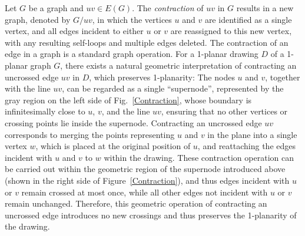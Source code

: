 \documentclass[12pt,a4paper]{article}
\begin{document}
Let $G$ be a graph and $uv \in E(G)$. The \emph{contraction} of $uv$ in $G$ results in a new graph, denoted by $G / uv$,  in which the vertices $u$ and $v$ are identified as a single vertex, and all edges incident to either $u$ or $v$ are reassigned to this new vertex, with any resulting self-loops and multiple edges deleted.  The contraction of an edge in a graph is a standard graph operation. For a 1-planar drawing $D$ of a 1-planar graph $G$, there exists a natural geometric interpretation of contracting an uncrossed edge $uv$ in $D$, which preserves 1-planarity: The nodes $u$ and $v$, together with the line $uv$, can be regarded as a single ``supernode'', represented by the gray region on the left side of Fig.~\ref{Contraction}, whose boundary is infinitesimally close to $u$, $v$, and the line $uv$, ensuring that no other vertices or crossing points lie inside the supernode. Contracting an uncrossed edge $u v$ corresponds to merging the points representing $u$ and $v$ in the plane into a single vertex $w$, which is placed at the original position of $u$, and reattaching the edges incident with $u$ and $v$ to $w$ within the drawing. These contraction operation can be carried out within the geometric region of the supernode introduced above (shown in the right side of  Figure~\ref{Contraction}), and thus  edges incident with $u$ or $v$ remain crossed at most once, while all other edges not incident with $u$ or $v$ remain unchanged. Therefore, this geometric operation of contracting an uncrossed edge introduces no new crossings and thus preserves the 1-planarity of the drawing.
\end{document}
